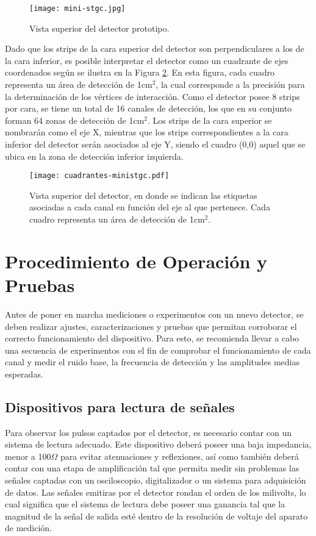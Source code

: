 	\begin{figure}[h]
		\centering
		\texttt{[image: mini-stgc.jpg]}
		\caption{Vista superior del detector prototipo.}
		\label{img:foto-mini-stgc}
	\end{figure}	
	
	Dado que los strips de la cara superior del detector son perpendiculares a los de la cara inferior, es posible interpretar el detector como un cuadrante de ejes coordenados según se ilustra en la Figura \ref{img:cuadrantes-ministgc}. En esta figura, cada cuadro representa un área de detección de 1cm$^2$, la cual corresponde a la precisión para la determinación de los vértices de interacción. Como el detector posee 8 strips por cara, se tiene un total de 16 canales de detección, los que en su conjunto forman 64 zonas de detección de 1cm$^2$. Los strips de la cara superior se nombrarán como el eje X, mientras que los strips correspondientes a la cara inferior del detector serán asociados al eje Y, siendo el cuadro (0,0) aquel que se ubica en la zona de detección inferior izquierda.
	
	\begin{figure}[h]
		\centering
		\texttt{[image: cuadrantes-ministgc.pdf]}
		\caption{Vista superior del detector, en donde se indican las etiquetas asociadas a cada canal en función del eje al que pertenece. Cada cuadro representa un área de detección de 1cm$^2$.}
		\label{img:cuadrantes-ministgc}
	\end{figure}

\section{Procedimiento de Operación y Pruebas}
	Antes de poner en marcha mediciones o experimentos con un nuevo detector, se deben realizar ajustes, caracterizaciones y pruebas que permitan corroborar el correcto funcionamiento del dispositivo. Para esto, se recomienda llevar a cabo una secuencia de experimentos con el fin de comprobar el funcionamiento de cada canal y medir el ruido base, la frecuencia de detección y las amplitudes medias esperadas.

	\subsection{Dispositivos para lectura de señales}
		Para observar los pulsos captados por el detector, es necesario contar con un sistema de lectura adecuado. Este dispositivo deberá poseer una  baja impedancia, menor a 100$\Omega$ para evitar atenuaciones y reflexiones, así como también deberá contar con una etapa de amplificación tal que permita medir sin problemas las señales captadas con un osciloscopio, digitalizador o un sistema para adquisición de datos. Las señales emitiras por el detector rondan el orden de los milivolts, lo cual significa que el sistema de lectura debe poseer una ganancia tal que la magnitud de la señal de salida esté dentro de la resolución de voltaje del aparato de medición.
		
